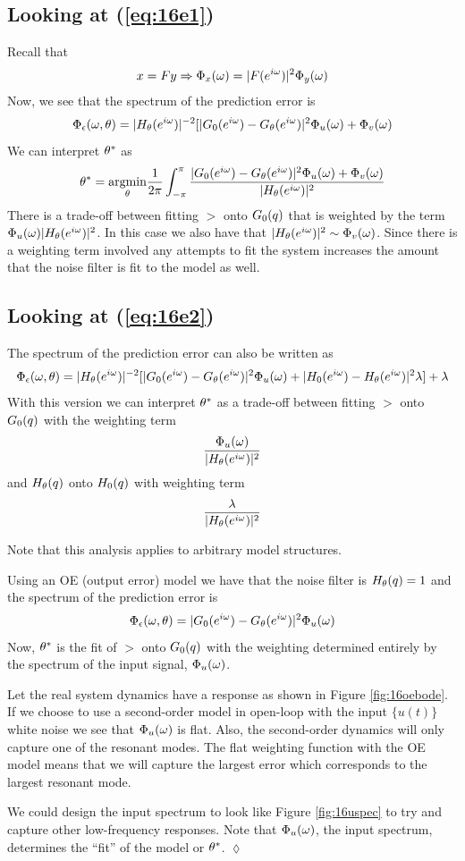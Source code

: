 \subsection{Looking at (\ref{eq:16e1})}
Recall that
$$x=Fy \Rightarrow \Phi_x(\omega)=|F(e^{i\omega})|^2\Phi_y(\omega)$$
Now, we see that the spectrum of the prediction error is
$$\Phi_\epsilon(\omega,\theta) = |H_\theta(e^{i\omega})|^{-2}[|G_0(e^{i\omega})-G_\theta(e^{i\omega})|^2\Phi_u(\omega) + \Phi_v(\omega)$$
We can interpret $\theta^\ast$ as
$$\theta^\ast = \underset{\theta}{\operatorname{argmin}} \frac{1}{2\pi} \int_{-\pi}^\pi \frac{|G_0(e^{i\omega})-G_\theta(e^{i\omega})|^2\Phi_u(\omega)+\Phi_v(\omega)}{|H_\theta(e^{i\omega})|^2}$$
There is a trade-off between fitting $\gt$ onto $G_0(q)$ that is weighted by the term $\Phi_u(\omega)|H_\theta(e^{i\omega})|^2$. In this case we also have that $|H_\theta(e^{i\omega})|^2\sim\Phi_v(\omega)$. Since there is a weighting term involved any attempts to fit the system increases the amount that the noise filter is fit to the model as well.

\subsection{Looking at (\ref{eq:16e2})}
The spectrum of the prediction error can also be written as
$$\Phi_\epsilon(\omega,\theta) = |H_\theta(e^{i\omega})|^{-2}[|G_0(e^{i\omega})-G_\theta(e^{i\omega})|^2\Phi_u(\omega)+|H_0(e^{i\omega})-H_\theta(e^{i\omega})|^2\lambda]+\lambda$$
With this version we can interpret $\theta^\ast$ as a trade-off between fitting $\gt$ onto $G_0(q)$ with the weighting term
$$\frac{\Phi_u(\omega)}{|H_\theta(e^{i\omega})|^2}$$
and $H_\theta(q)$ onto $H_0(q)$ with weighting term
$$\frac{\lambda}{|H_\theta(e^{i\omega})|^2}$$

Note that this analysis applies to arbitrary model structures.

\begin{example}
Using an OE (output error) model we have that the noise filter is $H_\theta(q)=1$ and the spectrum of the prediction error is
$$\Phi_\epsilon(\omega,\theta) = |G_0(e^{i\omega})-G_\theta(e^{i\omega})|^2\Phi_u(\omega)$$
Now, $\theta^\ast$ is the fit of $\gt$ onto $G_0(q)$ with the weighting determined entirely by the spectrum of the input signal, $\Phi_u(\omega)$.

Let the real system dynamics have a response as shown in Figure \ref{fig:16oebode}. If we choose to use a second-order model in open-loop with the input $\{u(t)\}$ white noise we see that $\Phi_u(\omega)$ is flat. Also, the second-order dynamics will only capture one of the resonant modes. The flat weighting function with the OE model means that we will capture the largest error which corresponds to the largest resonant mode.

We could design the input spectrum to look like Figure \ref{fig:16uspec} to try and capture other low-frequency responses. Note that $\Phi_u(\omega)$, the input spectrum, determines the ``fit'' of the model or $\theta^\ast$.
$\lozenge$
\end{example}

